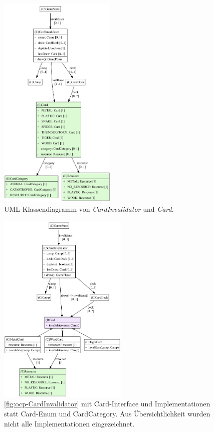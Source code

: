 \begin{figure}[H]
	\centering
	\includegraphics[width=0.5\textwidth]{Bilder/CardInvalidator_structure.pdf} 
	\caption{UML-Klassendiagramm von \textit{CardInvalidator} und \textit{Card}.}
	\label{fig:ocp-CardInvalidator}
\end{figure} 

\begin{figure}[H]
	\centering
	\includegraphics[width=0.55\textwidth]{Bilder/CardInvalidator_fixed_structure.pdf} 
	\caption{\autoref{fig:ocp-CardInvalidator} mit Card-Interface und Implementationen statt Card-Enum und CardCategory. 
	Aus Übersichtlichkeit wurden nicht alle Implementationen eingezeichnet.}
	\label{fig:ocp-CardInvalidator-fixed}
\end{figure} 


